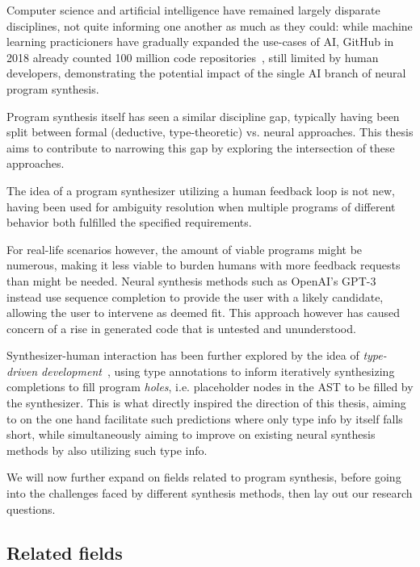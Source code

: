\documentclass{article}
\begin{document}

Computer science and artificial intelligence have remained largely disparate disciplines,
not quite informing one another as much as they could:
while machine learning practicioners have gradually expanded the use-cases of AI,
GitHub in 2018 already counted 100 million code repositories~\citep{github100m},
still limited by human developers,
demonstrating the potential impact of the single AI branch of neural program synthesis.

Program synthesis itself has seen a similar discipline gap,
typically having been split between formal (deductive, type-theoretic) vs. neural approaches.
This thesis aims to contribute to narrowing this gap by exploring the intersection of these approaches.

The idea of a program synthesizer utilizing a human feedback loop is not new,
having been used for ambiguity resolution when multiple programs
of different behavior both fulfilled the specified requirements.

For real-life scenarios however, the amount of viable programs might be numerous,
making it less viable to burden humans with more feedback requests than might be needed.
Neural synthesis methods such as OpenAI's GPT-3~\citep{gpt3code}
instead use sequence completion to provide the user with a likely candidate,
allowing the user to intervene as deemed fit.
This approach however has caused concern of a rise in generated code
that is untested and ununderstood.~\citep{gpt3bugs}

Synthesizer-human interaction has been further explored by the idea of \emph{type-driven development}~\citep{brady2017type},
using type annotations to inform iteratively synthesizing completions to fill program \emph{holes},
i.e. placeholder nodes in the AST to be filled by the synthesizer.
This is what directly inspired the direction of this thesis,
aiming to on the one hand facilitate such predictions where only type info by itself falls short,
while simultaneously aiming to improve on existing neural synthesis methods by also utilizing such type info.

We will now further expand on fields related to program synthesis,
before going into the challenges faced by different synthesis methods,
then lay out our research questions.

\subsection{Related fields}
\end{document}
